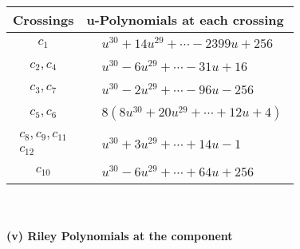 \documentclass[1p]{elsarticle_modified}
\theoremstyle{definition}
\begin{document}
\begin{tabular}{m{50pt}|m{274pt}}
Crossings & \hspace{64pt}u-Polynomials at each crossing \\
\hline $$\begin{aligned}c_{1}\end{aligned}$$&$\begin{aligned}
&u^{30}+14 u^{29}+\cdots-2399 u+256
\end{aligned}$\\
\hline $$\begin{aligned}c_{2},c_{4}\end{aligned}$$&$\begin{aligned}
&u^{30}-6 u^{29}+\cdots-31 u+16
\end{aligned}$\\
\hline $$\begin{aligned}c_{3},c_{7}\end{aligned}$$&$\begin{aligned}
&u^{30}-2 u^{29}+\cdots-96 u-256
\end{aligned}$\\
\hline $$\begin{aligned}c_{5},c_{6}\end{aligned}$$&$\begin{aligned}
&8(8 u^{30}+20 u^{29}+\cdots+12 u+4)
\end{aligned}$\\
\hline $$\begin{aligned}c_{8},c_{9},c_{11}\\c_{12}\end{aligned}$$&$\begin{aligned}
&u^{30}+3 u^{29}+\cdots+14 u-1
\end{aligned}$\\
\hline $$\begin{aligned}c_{10}\end{aligned}$$&$\begin{aligned}
&u^{30}-6 u^{29}+\cdots+64 u+256
\end{aligned}$\\
\hline
\end{tabular}\\~\\
\newpage\renewcommand{\arraystretch}{1}
\flushleft \textbf{(v) Riley Polynomials at the component}\newline \\
\end{document}
